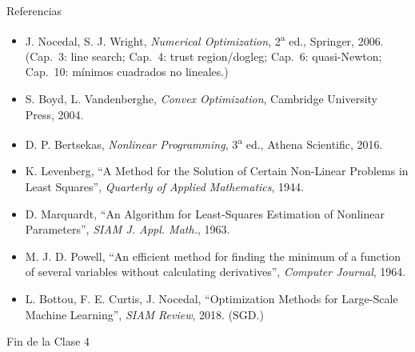 \documentclass[aspectratio=169]{beamer}
\begin{document}
\begin{frame}{Referencias}
  \footnotesize
  \begin{itemize}
    \item J. Nocedal, S. J. Wright, \emph{Numerical Optimization}, 2\textsuperscript{a} ed., Springer, 2006. (Cap.\ 3: line search; Cap.\ 4: trust region/dogleg; Cap.\ 6: quasi-Newton; Cap.\ 10: m\'inimos cuadrados no lineales.)
    \item S. Boyd, L. Vandenberghe, \emph{Convex Optimization}, Cambridge University Press, 2004.
    \item D. P. Bertsekas, \emph{Nonlinear Programming}, 3\textsuperscript{a} ed., Athena Scientific, 2016.
    \item K. Levenberg, ``A Method for the Solution of Certain Non-Linear Problems in Least Squares'', \emph{Quarterly of Applied Mathematics}, 1944.
    \item D. Marquardt, ``An Algorithm for Least-Squares Estimation of Nonlinear Parameters'', \emph{SIAM J. Appl. Math.}, 1963.
    \item M. J. D. Powell, ``An efficient method for finding the minimum of a function of several variables without calculating derivatives'', \emph{Computer Journal}, 1964.
    \item L. Bottou, F. E. Curtis, J. Nocedal, ``Optimization Methods for Large-Scale Machine Learning'', \emph{SIAM Review}, 2018. (SGD.)
  \end{itemize}
\end{frame}

\begin{frame}[standout]
  Fin de la Clase 4
\end{frame}
\end{document}
